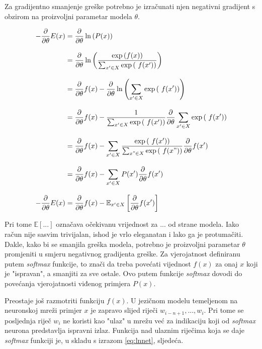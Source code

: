 \documentclass[times, utf8, diplomski, numeric]{fer}
\begin{document}
Za gradijentno smanjenje greške potrebno je izračunati njen negativni gradijent s obzirom na proizvoljni parametar modela $\theta$.

\begin{equation}
\setlength{\jot}{12pt}
\label{eq:grad_softmax}
\begin{split}
- \frac{\partial}{\partial \theta} E(x)
  & = \frac{\partial}{\partial \theta} \ln \left( P(x) \right)  \\
  & = \frac{\partial}{\partial \theta} \ln \left( \frac{\exp\left( f(x) \right)}{\sum_{x' \in X} \exp\left(\ f(x') \right)} \right) \\
  & = \frac{\partial}{\partial \theta}f(x)  - \frac{\partial}{\partial \theta} \ln \left( \sum_{x' \in X} \exp\left(\ f(x') \right) \right) \\
  & = \frac{\partial}{\partial \theta}f(x)  - \frac{1}{\sum_{x' \in X} \exp\left(\ f(x') \right)} \frac{\partial}{\partial \theta} \sum_{x' \in X} \exp\left(\ f(x') \right) \\
  & = \frac{\partial}{\partial \theta}f(x)  - \sum_{x' \in X} \frac{\exp\left(\ f(x') \right)}{\sum_{x" \in X} \exp\left(\ f(x") \right)} \frac{\partial}{\partial \theta} f(x') \\
  & = \frac{\partial}{\partial \theta}f(x) - \sum_{x' \in X} P(x') \frac{\partial}{\partial \theta} f(x') \\
- \frac{\partial}{\partial \theta} E(x)
  & = \frac{\partial}{\partial \theta}f(x) - \mathbb{E}_{x' \in X} \left[ \frac{\partial}{\partial \theta} f(x') \right] 
\end{split}
\end{equation}

Pri tome $\mathbb{E}[...]$ označava očekivanu vrijednost za $...$ od strane modela. Iako račun nije sasvim trivijalan, ishod je vrlo eleganatan i lako ga je protumačiti. Dakle, kako bi se smanjila greška modela, potrebno je proizvoljni parametar $\theta$ promjeniti u smjeru negativnog gradijenta greške. Za vjerojatnost definiranu putem \textit{softmax} funkcije, to znači da treba povećati vijednost $f(x)$ za onaj $x$ koji je "ispravan", a smanjiti za sve ostale. Ovo putem funkcije \textit{softmax} dovodi do povećanja vjerojatnosti viđenog primjera $P(x)$.

Preostaje još razmotriti funkciju $f(x)$. U jezičnom modelu temeljenom na neuronskoj mreži primjer $x$ je zapravo slijed riječi $w_{i - n + 1}, ..., w_i$. Pri tome se posljednja riječ $w_i$ ne koristi kao "ulaz" u mrežu već za indikaciju koji od \textit{softmax} neurona predstavlja ispravni izlaz. Funkcija nad ulaznim riječima koja se daje \textit{softmax} funkciji je, u skladu s izrazom \ref{eq:lnnet}, sljedeća.
\end{document}
